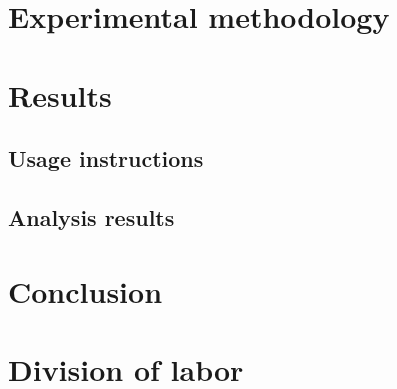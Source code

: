 \documentclass[12pt]{article}
\begin{document}
\section{Experimental methodology}

\section{Results}

\subsection{Usage instructions}
\subsection{Analysis results}

\section{Conclusion}

\section{Division of labor}
\end{document}
